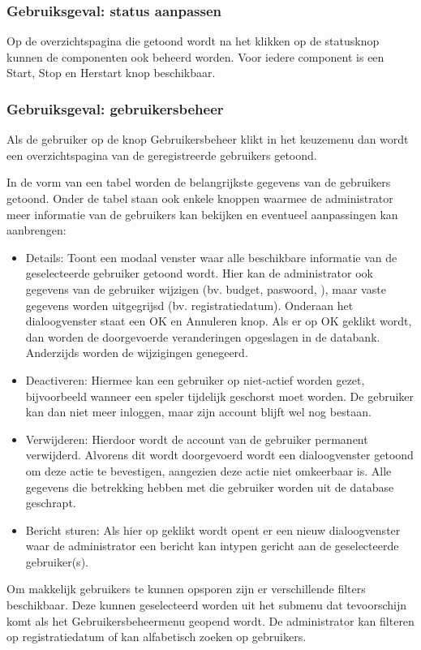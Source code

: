 \subsubsection{Gebruiksgeval: status aanpassen}
Op de overzichtspagina die getoond wordt na het klikken op de statusknop kunnen de componenten ook beheerd worden. Voor iedere component is een Start, Stop en Herstart knop beschikbaar.

\subsubsection{Gebruiksgeval: gebruikersbeheer}
Als de gebruiker op de knop Gebruikersbeheer klikt in het keuzemenu dan wordt een overzichtspagina van de geregistreerde gebruikers getoond.

In de vorm van een tabel worden de belangrijkste gegevens van de gebruikers getoond. Onder de tabel staan ook enkele knoppen waarmee de administrator meer informatie van de gebruikers kan bekijken en eventueel aanpassingen kan aanbrengen:
\begin{itemize}
	\item Details: Toont een modaal venster waar alle beschikbare informatie van de geselecteerde gebruiker getoond wordt. Hier kan de administrator ook gegevens van de gebruiker wijzigen (bv. budget, paswoord, ), maar vaste gegevens worden uitgegrijsd (bv. registratiedatum). Onderaan het dialoogvenster staat een OK en Annuleren knop. Als er op OK geklikt wordt, dan worden de doorgevoerde veranderingen opgeslagen in de databank. Anderzijds worden de wijzigingen genegeerd.
  \item Deactiveren: Hiermee kan een gebruiker op niet-actief worden gezet, bijvoorbeeld wanneer een speler tijdelijk geschorst moet worden. De gebruiker kan dan niet meer inloggen, maar zijn account blijft wel nog bestaan.
   \item Verwijderen: Hierdoor wordt de account van de gebruiker permanent verwijderd. Alvorens dit wordt doorgevoerd wordt een dialoogvenster getoond om deze actie te bevestigen, aangezien deze actie niet omkeerbaar is. Alle gegevens die betrekking hebben met die gebruiker worden uit de database geschrapt.
    \item Bericht sturen: Als hier op geklikt wordt opent er een nieuw dialoogvenster waar de administrator een bericht kan intypen gericht aan de geselecteerde gebruiker(s).
\end{itemize}
Om makkelijk gebruikers te kunnen opsporen zijn er verschillende filters beschikbaar. Deze kunnen geselecteerd worden uit het submenu dat tevoorschijn komt als het Gebruikersbeheermenu geopend wordt. De administrator kan filteren op registratiedatum of kan alfabetisch zoeken op gebruikers.

